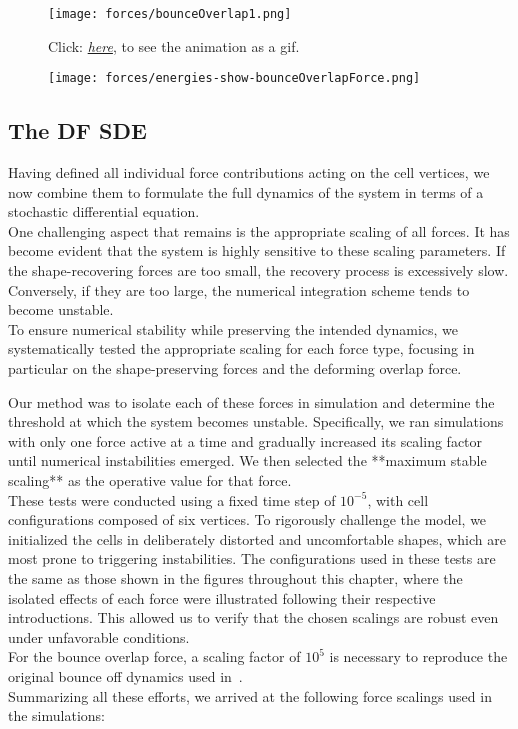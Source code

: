 \begin{figure}[h!]
	\begin{center}
		\texttt{[image: forces/bounceOverlap1.png]}
			\caption{Click: \href{https://github.com/tivo476c/FlexibleCellModel/blob/master/figures/gifs/showForces/show-bounceOverlapForce.gif}{\textit{here}}, to see the animation as a gif.
			}
			\label{fig:bounceOverlapForce}
	\end{center}
\end{figure}

\begin{figure}
	\begin{center}
		\texttt{[image: forces/energies-show-bounceOverlapForce.png]}
		\caption{}
		\label{fig:bounceOverlapEnergy}
	\end{center}
\end{figure}

\subsection{The DF SDE}
Having defined all individual force contributions acting on the cell vertices, we now combine them to formulate the full dynamics of the system in terms of a stochastic differential equation. \\
One challenging aspect that remains is the appropriate scaling of all forces.
It has become evident that the system is highly sensitive to these scaling parameters. 
If the shape-recovering forces are too small, the recovery process is excessively slow. 
Conversely, if they are too large, the numerical integration scheme tends to become unstable. \\ 
To ensure numerical stability while preserving the intended dynamics, we systematically tested the appropriate scaling for each force type, focusing in particular on the shape-preserving forces and the deforming overlap force.

Our method was to isolate each of these forces in simulation and determine the threshold at which the system becomes unstable. 
Specifically, we ran simulations with only one force active at a time and gradually increased its scaling factor until numerical instabilities emerged. 
We then selected the **maximum stable scaling** as the operative value for that force. \\
These tests were conducted using a fixed time step of $10^{-5}$, with cell configurations composed of six vertices. 
To rigorously challenge the model, we initialized the cells in deliberately distorted and uncomfortable shapes, which are most prone to triggering instabilities. 
The configurations used in these tests are the same as those shown in the figures throughout this chapter, where the isolated effects of each force were illustrated following their respective introductions. 
This allowed us to verify that the chosen scalings are robust even under unfavorable conditions. \\
For the bounce overlap force, a scaling factor of $10^5$ is necessary to reproduce the original bounce off dynamics used in~\cite{Bruna2012}. \\
Summarizing all these efforts, we arrived at the following force scalings used in the simulations:

